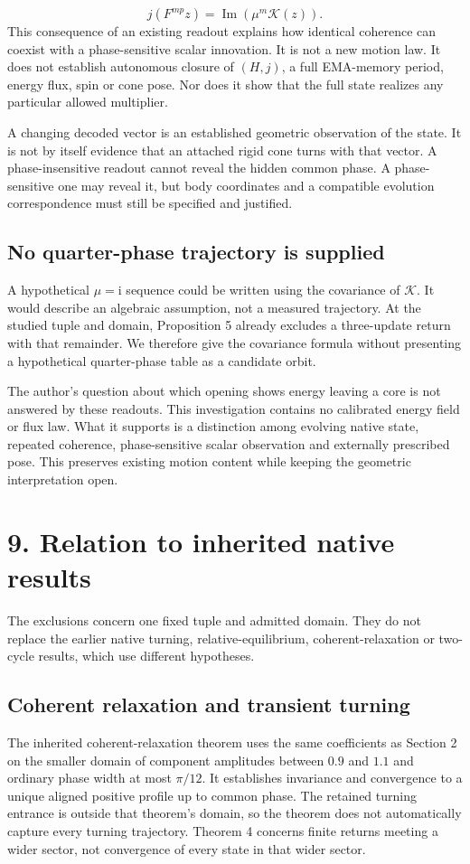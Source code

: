 \documentclass[11pt,a4paper]{article}
\begin{document}
\begin{equation}j(F^{mp}z)=\operatorname{Im}\left(\mu^m\mathcal{K}(z)\right).\end{equation}
This consequence of an existing readout explains how identical coherence can coexist with a phase-sensitive scalar innovation. It is not a new motion law. It does not establish autonomous closure of $(H,j)$, a full EMA-memory period, energy flux, spin or cone pose. Nor does it show that the full state realizes any particular allowed multiplier. \cite{D02} \cite{REV02}

A changing decoded vector is an established geometric observation of the state. It is not by itself evidence that an attached rigid cone turns with that vector. A phase-insensitive readout cannot reveal the hidden common phase. A phase-sensitive one may reveal it, but body coordinates and a compatible evolution correspondence must still be specified and justified.

\subsection*{No quarter-phase trajectory is supplied}
A hypothetical $\mu=\mathrm{i}$ sequence could be written using the covariance of $\mathcal{K}$. It would describe an algebraic assumption, not a measured trajectory. At the studied tuple and domain, Proposition 5 already excludes a three-update return with that remainder. We therefore give the covariance formula without presenting a hypothetical quarter-phase table as a candidate orbit.

The author’s question about which opening shows energy leaving a core is not answered by these readouts. This investigation contains no calibrated energy field or flux law. What it supports is a distinction among evolving native state, repeated coherence, phase-sensitive scalar observation and externally prescribed pose. This preserves existing motion content while keeping the geometric interpretation open.

\clearpage
\section*{9. Relation to inherited native results}
The exclusions concern one fixed tuple and admitted domain. They do not replace the earlier native turning, relative-equilibrium, coherent-relaxation or two-cycle results, which use different hypotheses.

\subsection*{Coherent relaxation and transient turning}
The inherited coherent-relaxation theorem uses the same coefficients as Section 2 on the smaller domain of component amplitudes between $0.9$ and $1.1$ and ordinary phase width at most $\pi/12$. It establishes invariance and convergence to a unique aligned positive profile up to common phase. The retained turning entrance is outside that theorem’s domain, so the theorem does not automatically capture every turning trajectory. Theorem 4 concerns finite returns meeting a wider sector, not convergence of every state in that wider sector. \cite{COH}
\end{document}
